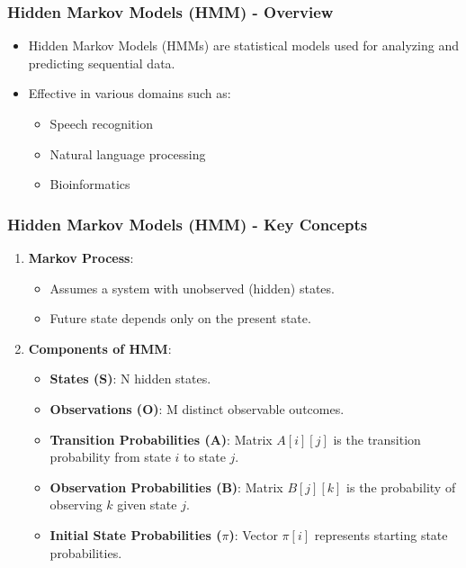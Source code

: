 \documentclass[aspectratio=169]{beamer}
\begin{document}
\begin{frame}[fragile]
    \frametitle{Hidden Markov Models (HMM) - Overview}
    \begin{itemize}
        \item Hidden Markov Models (HMMs) are statistical models used for analyzing and predicting sequential data.
        \item Effective in various domains such as:
        \begin{itemize}
            \item Speech recognition
            \item Natural language processing
            \item Bioinformatics
        \end{itemize}
    \end{itemize}
\end{frame}

\begin{frame}[fragile]
    \frametitle{Hidden Markov Models (HMM) - Key Concepts}
    \begin{enumerate}
        \item \textbf{Markov Process}: 
        \begin{itemize}
            \item Assumes a system with unobserved (hidden) states.
            \item Future state depends only on the present state.
        \end{itemize}

        \item \textbf{Components of HMM}:
        \begin{itemize}
            \item \textbf{States (S)}: N hidden states.
            \item \textbf{Observations (O)}: M distinct observable outcomes.
            \item \textbf{Transition Probabilities (A)}: Matrix \(A[i][j]\) is the transition probability from state \(i\) to state \(j\).
            \item \textbf{Observation Probabilities (B)}: Matrix \(B[j][k]\) is the probability of observing \(k\) given state \(j\).
            \item \textbf{Initial State Probabilities (\(\pi\))}: Vector \(\pi[i]\) represents starting state probabilities.
        \end{itemize}
    \end{enumerate}
\end{frame}
\end{document}
